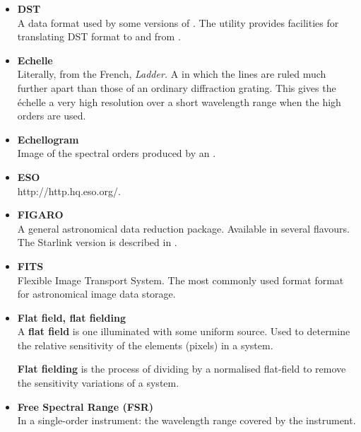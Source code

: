 {{\begin{itemize}
\item {\bf\label{gl_dst}DST}\\
      A data format used by some versions of .
      The  utility provides facilities for
      translating DST format to and from .

\item {\bf\label{gl_echelle}Echelle}\\
      Literally, from the French, {\sl Ladder.}
      A  in which the
      lines are ruled much further apart than those of an ordinary
      diffraction grating.  This gives the \'{e}chelle a very high
      resolution over a short wavelength range when the high orders are
      used.

\item {\bf\label{gl_echellogram}Echellogram}\\
      Image of the spectral orders produced by an
      .

\item {\bf\label{gl_eso}ESO}\\
      {http://http.hq.eso.org/}.

\item {\bf\label{gl_figaro}FIGARO}\\
      A general astronomical data reduction package.  Available in
      several flavours.  The Starlink version is described in
      .

\item {\bf\label{gl_fits}FITS}\\
      Flexible Image Transport System.  The most commonly used format
      format for astronomical image data storage.

\item {\bf\label{gl_flat_field}Flat field, flat fielding}\\
      A {\bf flat field} is one illuminated with some uniform source.
      Used to determine the relative sensitivity of the elements
      (pixels) in a system.

      {\bf Flat fielding} is the process of dividing by a normalised
      flat-field to remove the sensitivity variations of a system.

\item {\bf\label{gl_fsr}Free Spectral Range (FSR)}\\
      In a single-order instrument: the wavelength range covered by the
      instrument.


\end{itemize}}}
